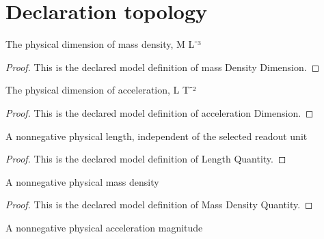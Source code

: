 \section{Declaration topology}
\begin{definition}
  \label{def:physics:phyx-mini-0387:phyxminiproblems-problemphyxmini0387-massdensitydimension}
  The physical dimension of mass density, M L⁻³
\end{definition}
\begin{proof}
  This is the declared model definition of mass Density Dimension.
\end{proof}
\begin{definition}
  \label{def:physics:phyx-mini-0387:phyxminiproblems-problemphyxmini0387-accelerationdimension}
  The physical dimension of acceleration, L T⁻²
\end{definition}
\begin{proof}
  This is the declared model definition of acceleration Dimension.
\end{proof}
\begin{definition}
  \label{def:physics:phyx-mini-0387:phyxminiproblems-problemphyxmini0387-lengthquantity}
  A nonnegative physical length, independent of the selected readout unit
\end{definition}
\begin{proof}
  This is the declared model definition of Length Quantity.
\end{proof}
\begin{definition}
  \label{def:physics:phyx-mini-0387:phyxminiproblems-problemphyxmini0387-massdensityquantity}
  A nonnegative physical mass density
\end{definition}
\begin{proof}
  This is the declared model definition of Mass Density Quantity.
\end{proof}
\begin{definition}
  \label{def:physics:phyx-mini-0387:phyxminiproblems-problemphyxmini0387-accelerationquantity}
  A nonnegative physical acceleration magnitude
\end{definition}
